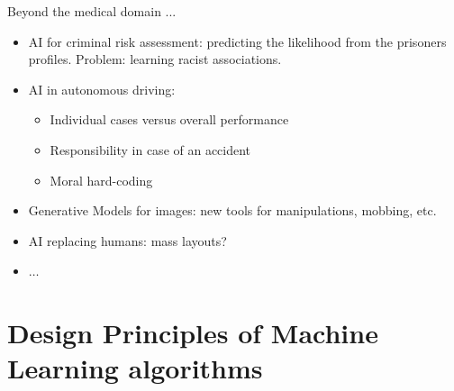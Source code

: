 \documentclass[xcolor=pdftex,dvipsnames,table]{beamer}
\begin{document}
\begin{frame}{Beyond the medical domain ... }
\begin{itemize}
\item AI for criminal risk assessment: predicting the likelihood  from the prisoners profiles. Problem: learning racist associations.
\item AI in autonomous driving:
\begin{itemize}
	\item Individual cases versus overall performance
	\item Responsibility in case of an accident
	\item Moral hard-coding
\end{itemize}
\item Generative Models for images: new tools for manipulations, mobbing, etc.
\item AI replacing humans: mass layouts?
\item $\ldots$
\end{itemize}

\end{frame}




\section{Design Principles of Machine Learning algorithms}
\end{document}
